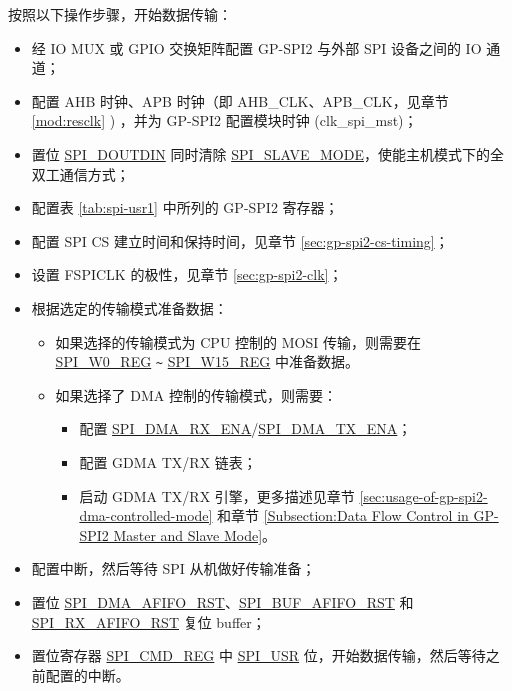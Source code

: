 \documentclass[main\_\_CN.tex]{subfiles}
\begin{document}
按照以下操作步骤，开始数据传输：
\begin{itemize}
    \item 经 IO MUX 或 GPIO 交换矩阵配置 GP-SPI2 与外部 SPI 设备之间的 IO 通道；
    \item 配置 AHB 时钟、APB 时钟（即 AHB\_CLK、APB\_CLK，见章节  \ref{mod:resclk} \textit{}) ，并为 GP-SPI2 配置模块时钟 (clk\_spi\_mst)；
    \item 置位 \hyperref[fielddesc:SPIDOUTDIN]{SPI\_DOUTDIN} 同时清除 \hyperref[fielddesc:SPISLAVEMODE]{SPI\_SLAVE\_MODE}，使能主机模式下的全双工通信方式；

    \item 配置表  \ref{tab:spi-usr1} 中所列的 GP-SPI2 寄存器；

    \item 配置 SPI CS 建立时间和保持时间，见章节  \ref{sec:gp-spi2-cs-timing}；

    \item 设置 FSPICLK 的极性，见章节  \ref{sec:gp-spi2-clk}；

    \item 根据选定的传输模式准备数据：
    \begin{itemize}
        \item 如果选择的传输模式为 CPU 控制的 MOSI 传输，则需要在 \hyperref[regdesc:SPIW0REG]{SPI\_W0\_REG} \verb+~+ \hyperref[regdesc:SPIW15REG]{SPI\_W15\_REG} 中准备数据。

        \item 如果选择了 DMA 控制的传输模式，则需要：
        \begin{itemize}
            \item 配置 \hyperref[fielddesc:SPIDMARXENA]{SPI\_DMA\_RX\_ENA}/\hyperref[fielddesc:SPIDMATXENA]{SPI\_DMA\_TX\_ENA}；
            \item 配置 GDMA TX/RX 链表；
            \item 启动 GDMA TX/RX 引擎，更多描述见章节  \ref{sec:usage-of-gp-spi2-dma-controlled-mode} 和章节  \ref{Subsection:Data Flow Control in GP-SPI2 Master and Slave Mode}。
        \end{itemize}
    \end{itemize}

    \item 配置中断，然后等待 SPI 从机做好传输准备；

    \item 置位 \hyperref[fielddesc:SPIDMAAFIFORST]{SPI\_DMA\_AFIFO\_RST}、\hyperref[fielddesc:SPIBUFAFIFORST]{SPI\_BUF\_AFIFO\_RST} 和 \hyperref[fielddesc:SPIRXAFIFORST]{SPI\_RX\_AFIFO\_RST} 复位 buffer；

    \item 置位寄存器 \hyperref[regdesc:SPICMDREG]{SPI\_CMD\_REG} 中 \hyperref[fielddesc:SPIUSR]{SPI\_USR} 位，开始数据传输，然后等待之前配置的中断。

\end{itemize}
\end{document}
